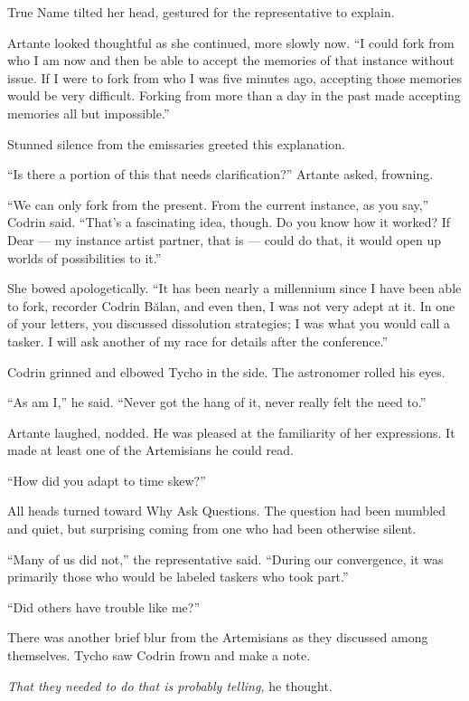 True Name tilted her head, gestured for the representative to explain.

Artante looked thoughtful as she continued, more slowly now. ``I could fork from who I am now and then be able to accept the memories of that instance without issue. If I were to fork from who I was five minutes ago, accepting those memories would be very difficult. Forking from more than a day in the past made accepting memories all but impossible.''

Stunned silence from the emissaries greeted this explanation.

``Is there a portion of this that needs clarification?'' Artante asked, frowning.

``We can only fork from the present. From the current instance, as you say,'' Codrin said. ``That's a fascinating idea, though. Do you know how it worked? If Dear — my instance artist partner, that is — could do that, it would open up worlds of possibilities to it.''

She bowed apologetically. ``It has been nearly a millennium since I have been able to fork, recorder Codrin Bălan, and even then, I was not very adept at it. In one of your letters, you discussed dissolution strategies; I was what you would call a tasker. I will ask another of my race for details after the conference.''

Codrin grinned and elbowed Tycho in the side. The astronomer rolled his eyes.

``As am I,'' he said. ``Never got the hang of it, never really felt the need to.''

Artante laughed, nodded. He was pleased at the familiarity of her expressions. It made at least one of the Artemisians he could read.

``How did you adapt to time skew?''

All heads turned toward Why Ask Questions. The question had been mumbled and quiet, but surprising coming from one who had been otherwise silent.

``Many of us did not,'' the representative said. ``During our convergence, it was primarily those who would be labeled taskers who took part.''

``Did others have trouble like me?''

There was another brief blur from the Artemisians as they discussed among themselves. Tycho saw Codrin frown and make a note.

\emph{That they needed to do that is probably telling,} he thought.

